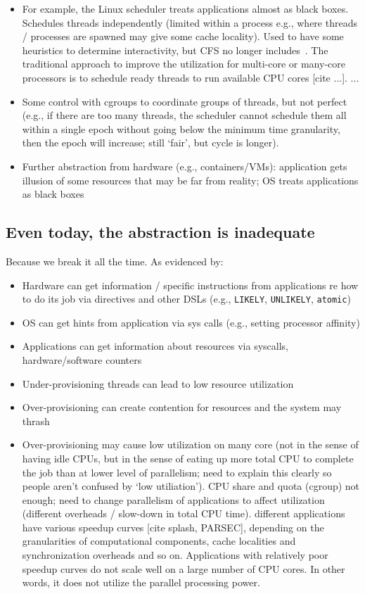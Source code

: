 \begin{itemize}
  \item For example, the Linux scheduler treats applications almost as black boxes. Schedules threads independently (limited within a process e.g., where threads / processes are spawned may give some cache locality). Used to have some heuristics to determine interactivity, but CFS no longer includes~\cite{molnar2007cfs}. The traditional approach to improve the utilization for multi-core or many-core processors is to schedule ready threads to run available CPU cores [cite ...].  ...
  \item Some control with cgroups to coordinate groups of threads, but not perfect (e.g., if there are too many threads, the scheduler cannot schedule them all within a single epoch without going below the minimum time granularity, then the epoch will increase; still `fair', but cycle is longer).
  \item Further abstraction from hardware (e.g., containers/VMs): application gets illusion of some resources that may be far from reality; OS treats applications as black boxes
\end{itemize}

\subsection{Even today, the abstraction is inadequate}
Because we break it all the time. As evidenced by:
\begin{itemize}
\item Hardware can get information / specific instructions from applications re how to do its job via directives and other DSLs (e.g., \texttt{LIKELY}, \texttt{UNLIKELY}, \texttt{atomic})
\item OS can get hints from application via sys calls (e.g., setting processor affinity)
\item Applications can get information about resources via syscalls, hardware/software counters
\end{itemize}

\begin{itemize}
	\item Under-provisioning threads can lead to low resource utilization
    \item Over-provisioning can create contention for resources and the system may thrash
 	\item Over-provisioning may cause low utilization on many core (not in the sense of having idle CPUs, but in the sense of eating up more total CPU to complete the job than at lower level of parallelism; need to explain this clearly so people aren't confused by `low utiliation'). CPU share and quota (cgroup) not enough; need to change parallelism of applications to affect utilization (different overheads / slow-down in total CPU time). different applications have various speedup curves [cite splash, PARSEC], depending on the granularities of computational components, cache localities and synchronization overheads and so on.  Applications with relatively poor speedup curves do not scale well on a large number of CPU cores.  In other words, it does not utilize the parallel processing power.
\end{itemize}

